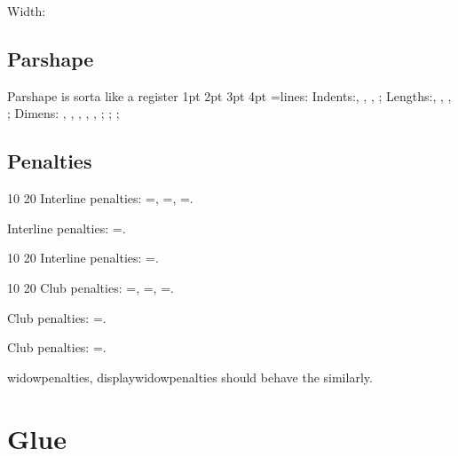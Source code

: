 \documentclass{article}
\begin{document}
\protected{}
\protected\def\protectedmyminus{-}
\protected{}
\protected{}
\mydima\protectedmyminus\protectedmyone\protectedmytwo\protectedmypts\relax
Width:\the\mydima

\subsection{Parshape}
Parshape is sorta like a register
\newcount\mynum
{} 1pt 2pt 3pt 4pt
\mynum=\parshape\relax \the\mynum lines:
Indents:\the{}\relax,
\the{}\relax,
\the{}\relax,
\the{}\relax;
Lengths:\the{}\relax,
\the{}\relax,
\the{}\relax,
\the{}\relax;
Dimens:
\the{}\relax,
\the{}\relax,
\the{}\relax,
\the{}\relax,
\the{}\relax,
\the{}\relax;
\the{}\relax;
\the{}\relax;

\subsection{Penalties}
 10 20
Interline penalties:
 \mynum=\relax \the\mynum,
 \mynum=\relax \the\mynum,
 \mynum=\relax \the\mynum.

Interline penalties:
 \mynum=\relax \the\mynum.

 10 20
Interline penalties:
 \mynum=\relax \the\mynum.

  10 20
Club penalties:
 \mynum=\relax \the\mynum,
 \mynum=\relax \the\mynum,
 \mynum=\relax \the\mynum.
 
 Club penalties:
 \mynum=\relax \the\mynum.

Club penalties:
 \mynum=\relax \the\mynum.

widowpenalties, displaywidowpenalties should behave the similarly.

\section{Glue}
\def\showskip#1{
  \the#1 : stretch \the\gluestretch#1\ \the\gluestretchorder#1 ;
 shrink \the\glueshrink#1\ \the\glueshrinkorder#1.}
\newskip\myskip
\end{document}
